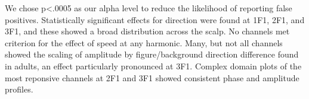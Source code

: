 \documentclass[landscape,final,paperwidth=72in,paperheight=42in,fontscale=0.285]{baposter}
\begin{document}
\begin{poster}
    {
    }


%      
%      
      

    {
      We chose p<.0005 as our alpha level to reduce the likelihood of reporting false positives. 
Statistically significant effects for direction were found at 1F1, 2F1, and 3F1, and these showed a broad distribution across the scalp. 
No channels met criterion for the effect of speed at any harmonic. 
Many, but not all channels showed the scaling of amplitude by figure/background direction difference found in adults, an effect particularly pronounced at 3F1. 
Complex domain plots of the most reponsive channels at 2F1 and 3F1 showed consistent phase and amplitude profiles. 

}
\end{poster}
\end{document}
